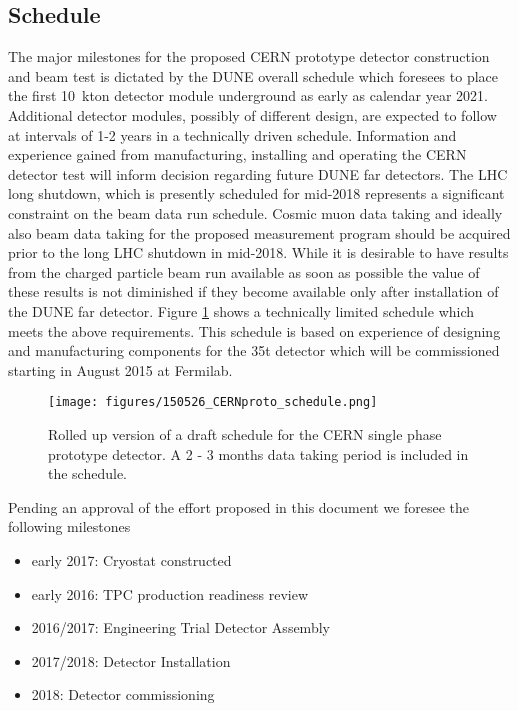 \label{organ}

\subsection{Schedule}
The major milestones for the proposed CERN prototype detector construction and beam test is dictated by the DUNE overall schedule which foresees to place the first 10~kton detector module underground as early as calendar year 2021. Additional detector modules, possibly of different design, are expected to follow at intervals of 1-2 years in a technically driven schedule.
Information and experience gained from manufacturing, installing and operating the CERN detector test will inform decision regarding future DUNE far detectors.
The LHC long shutdown, which is presently scheduled for mid-2018 represents a significant constraint on the beam data run schedule.
Cosmic muon data taking and ideally also beam data taking for the proposed measurement program 
should be acquired prior to  the long LHC shutdown in mid-2018. 
While it is desirable to have results from the charged particle beam run available as soon as possible the value of these results is not diminished if they become available only after installation of the DUNE far detector.
Figure \ref{fig:schedule} shows a technically limited schedule which meets the above requirements.
This schedule is based on experience of designing and manufacturing components for the 35t detector which will be commissioned starting in August 2015 at  Fermilab.
%
\begin{figure}[htb]
  \centering
\texttt{[image: figures/150526\_CERNproto\_schedule.png]}
  \caption{Rolled up version of a draft schedule for the CERN single phase prototype detector. A 2 - 3 months data taking period is included in the schedule. }
  \label{fig:schedule}
\end{figure}
%
Pending an approval of the effort proposed in this document we foresee the following milestones
\begin{itemize}
\item early 2017: Cryostat constructed
\item early 2016: TPC production readiness review
\item 2016/2017: Engineering Trial Detector Assembly
\item 2017/2018: Detector Installation
\item 2018: Detector commissioning 
\end{itemize}


